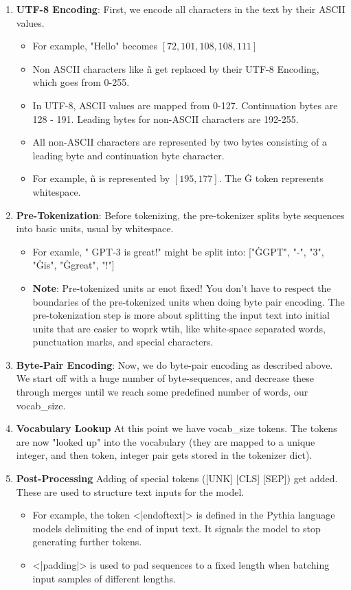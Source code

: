 \documentclass[12pt]{article}
\begin{document}
\begin{enumerate}
\item \textbf{UTF-8 Encoding}: First, we encode all characters in the text by their ASCII values. \\
\begin{itemize}
\item For example, "Hello" becomes \([72, 101, 108, 108, 111]\)
\item Non ASCII characters like ñ get replaced by their UTF-8 Encoding, which goes from 0-255.
\item In UTF-8, ASCII values are mapped from 0-127. Continuation bytes are 128 - 191.  Leading bytes for non-ASCII characters are 192-255. 
\item All non-ASCII characters are represented by two bytes consisting of a leading byte and continuation byte character.
\item For example, ñ is represented by \([195, 177]\). The Ġ token represents whitespace.
\end{itemize}
\item \textbf{Pre-Tokenization}: Before tokenizing, the pre-tokenizer splits byte sequences into basic units, usual by whitespace. \\
\begin{itemize}
\item For examle, " GPT-3 is great!" might be split into: ["ĠGPT", "-", "3", "Ġis", "Ġgreat", "!"]
\item \textbf{Note}: Pre-tokenized units ar enot fixed! You don't have to respect the boundaries of the pre-tokenized units when doing byte pair encoding. The pre-tokenization step is more about splitting the input text into initial units that are easier to woprk wtih, like white-space separated words, punctuation marks, and special characters.
\end{itemize}
\item \textbf{Byte-Pair Encoding}: Now, we do byte-pair encoding as described above. We start off with a huge number of byte-sequences, and decrease these through merges until we reach some predefined number of words, our vocab\_size.
\item \textbf{Vocabulary Lookup} At this point we have vocab\_size tokens. The tokens are now "looked up" into the vocabulary (they are mapped to a unique integer, and then token, integer pair gets stored in the tokenizer dict).
\item \textbf{Post-Processing} Adding of special tokens ([UNK] [CLS] [SEP]) get added. These are used to structure text inputs for the model. 
\begin{itemize}
    \item For example, the token \textless|endoftext|\textgreater{} is defined in the Pythia language models delimiting the end of input text. It signals the model to stop generating further tokens.
    \item \textless|padding|\textgreater{} is used to pad sequences to a fixed length when batching input samples of different lengths.
\end{itemize}
\end{enumerate}
\end{document}
